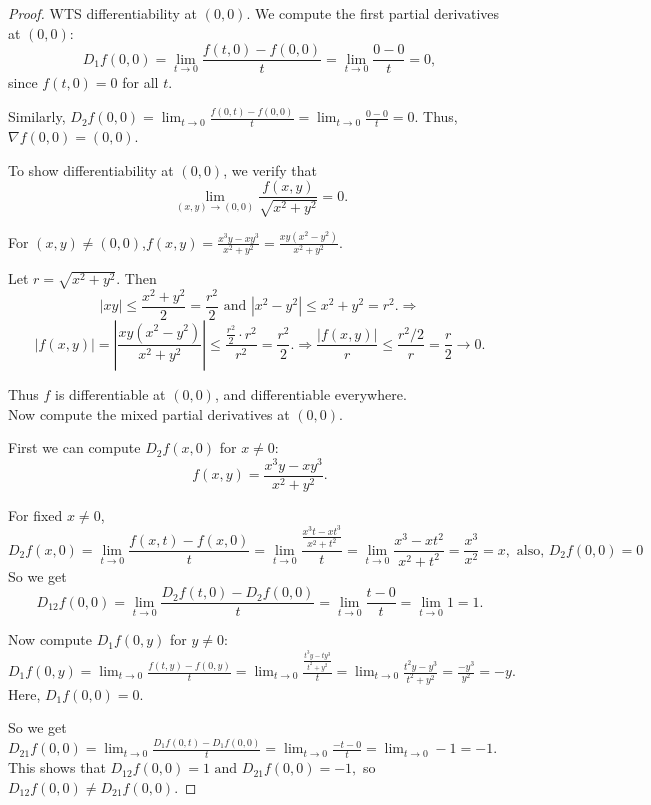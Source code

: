 \documentclass{article}
\begin{document}
\begin{proof}
WTS differentiability at $(0,0)$. We compute the first partial derivatives at $(0,0)$:
$$D_1f(0,0)=\lim_{t \to 0}\frac{f(t,0)-f(0,0)}{t}
=\lim_{t \to 0}\frac{0-0}{t}=0,$$
since $f(t,0)=0$ for all $t$.

Similarly, $D_2f(0,0)=\lim_{t \to 0}\frac{f(0,t)-f(0,0)}{t}
=\lim_{t \to 0}\frac{0-0}{t}=0.$ Thus, $\nabla f(0,0)=(0,0)$.

To show differentiability at $(0,0)$, we verify that
$$\lim_{(x,y)\to(0,0)}\frac{f(x,y)}{\sqrt{x^2+y^2}}=0.$$

For $(x,y)\neq (0,0)$,$f(x,y)=\frac{x^3y-xy^3}{x^2+y^2}
=\frac{xy(x^2-y^2)}{x^2+y^2}.$

Let $r=\sqrt{x^2+y^2}$. Then
$$|xy|\le \frac{x^2+y^2}{2}=\frac{r^2}{2} \text{ and }
|x^2-y^2|\le x^2+y^2=r^2. \Rightarrow$$
$$|f(x,y)|
=\left|\frac{xy(x^2-y^2)}{x^2+y^2}\right|
\le \frac{\frac{r^2}{2}\cdot r^2}{r^2}
=\frac{r^2}{2}. \Rightarrow \frac{|f(x,y)|}{r}\le \frac{r^2/2}{r}=\frac{r}{2}\to 0.$$

Thus $f$ is differentiable at $(0,0)$, and differentiable everywhere. \\

Now compute the mixed partial derivatives at $(0,0)$.

First we can compute $D_2f(x,0)$ for $x\neq 0$:
$$f(x,y)=\frac{x^3y-xy^3}{x^2+y^2}.$$

For fixed $x\neq 0$,
$$D_2f(x,0)
=\lim_{t\to 0}\frac{f(x,t)-f(x,0)}{t}
=\lim_{t\to 0}\frac{\frac{x^3t-xt^3}{x^2+t^2}}{t}
=\lim_{t\to 0}\frac{x^3-xt^2}{x^2+t^2}
=\frac{x^3}{x^2}=x, \text{ also, } D_2f(0,0)=0$$
So we get
$$D_{12}f(0,0)
=\lim_{t \to 0}\frac{D_2f(t,0)-D_2f(0,0)}{t}
=\lim_{t \to 0}\frac{t-0}{t}
=\lim_{t \to 0}1
=1.$$

Now compute $D_1f(0,y)$ for $y\neq 0$:$D_1f(0,y)
=\lim_{t\to 0}\frac{f(t,y)-f(0,y)}{t}
=\lim_{t\to 0}\frac{\frac{t^3y-ty^3}{t^2+y^2}}{t}
=\lim_{t\to 0}\frac{t^2y-y^3}{t^2+y^2}
=\frac{-y^3}{y^2}
=-y.$ Here, $D_1f(0,0)=0$.

So we get$D_{21}f(0,0)
=\lim_{t \to 0}\frac{D_1f(0,t)-D_1f(0,0)}{t}
=\lim_{t \to 0}\frac{-t-0}{t}
=\lim_{t \to 0}-1
=-1.$
This shows that $D_{12}f(0,0)=1 \text{ and } D_{21}f(0,0)=-1,$ so $D_{12}f(0,0)\neq D_{21}f(0,0).$

\end{proof}

\clearpage %
\end{document}
